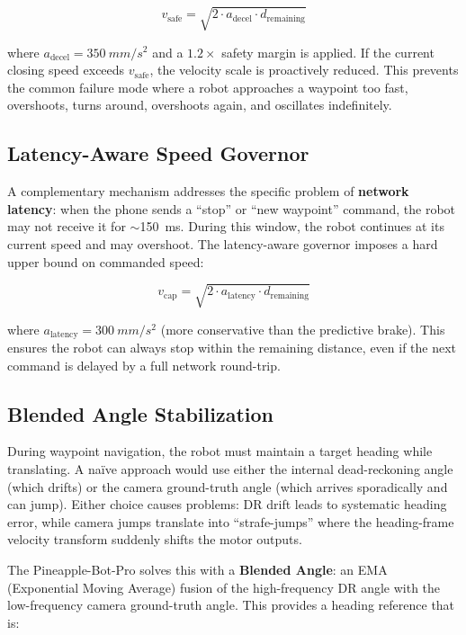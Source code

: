 \documentclass[12pt, a4paper, twoside]{article}
\begin{document}
\begin{equation}
    v_{\text{safe}} = \sqrt{2 \cdot a_{\text{decel}} \cdot d_{\text{remaining}}}
    \label{eq:vsafe}
\end{equation}

\noindent where $a_{\text{decel}} = \SI{350}{mm/s^2}$ and a $1.2\times$ safety margin is applied. If the current closing speed exceeds $v_{\text{safe}}$, the velocity scale is proactively reduced. This prevents the common failure mode where a robot approaches a waypoint too fast, overshoots, turns around, overshoots again, and oscillates indefinitely.

\subsection{Latency-Aware Speed Governor}

A complementary mechanism addresses the specific problem of \textbf{network latency}: when the phone sends a ``stop'' or ``new waypoint'' command, the robot may not receive it for {$\sim$\SI{150}{\milli\second}}. During this window, the robot continues at its current speed and may overshoot. The latency-aware governor imposes a hard upper bound on commanded speed:

\begin{equation}
    v_{\text{cap}} = \sqrt{2 \cdot a_{\text{latency}} \cdot d_{\text{remaining}}}
\end{equation}

\noindent where $a_{\text{latency}} = \SI{300}{mm/s^2}$ (more conservative than the predictive brake). This ensures the robot can always stop within the remaining distance, even if the next command is delayed by a full network round-trip.

\subsection{Blended Angle Stabilization}

During waypoint navigation, the robot must maintain a target heading while translating. A na\"ive approach would use either the internal dead-reckoning angle (which drifts) or the camera ground-truth angle (which arrives sporadically and can jump). Either choice causes problems: DR drift leads to systematic heading error, while camera jumps translate into ``strafe-jumps'' where the heading-frame velocity transform suddenly shifts the motor outputs.

The Pineapple-Bot-Pro solves this with a \textbf{Blended Angle}: an EMA (Exponential Moving Average) fusion of the high-frequency DR angle with the low-frequency camera ground-truth angle. This provides a heading reference that is:
\end{document}

